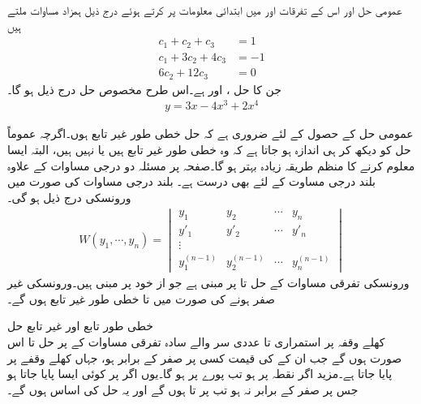 عمومی حل اور اس کے تفرقات  اور  میں ابتدائی معلومات پر کرتے ہوئے درج ذیل ہمزاد مساوات ملتے ہیں
\begin{align*}
c_1+c_2+c_3&=1\\
c_1+3c_2+4c_3&=-1\\
6c_2+12c_3&=0
\end{align*}
جن کا حل ،  اور  ہے۔اس طرح مخصوص حل درج ذیل ہو گا۔
\begin{align*}
y=3x-4x^3+2x^4
\end{align*}

عمومی حل کے حصول کے لئے ضروری ہے کہ حل خطی طور غیر تابع ہوں۔اگرچہ عموماً حل کو دیکھ کر ہی اندازہ ہو جاتا ہے کہ  وہ خطی طور غیر تابع ہیں یا نہیں ہیں، البتہ ایسا معلوم کرنے کا منظم طریقہ زیادہ بہتر ہو گا۔صفحہ  پر مسئلہ  دو درجی   مساوات کے علاوہ بلند درجی مساوت کے لئے بھی درست ہے۔ بلند درجی مساوات کی صورت میں ورونسکی درج ذیل ہو گی۔
\begin{align}\label{مساوات_سادہ_بلند_ورونسکی_الف}
W(y_1,\cdots, y_n)=
\begin{vmatrix}
y_1 & y_2 & \cdots & y_n\\
y'_1 & y'_2 & \cdots & y'_n\\
\vdots & & \\
y_1^{(n-1)} & y_2^{(n-1)} & \cdots & y_n^{(n-1)}
\end{vmatrix}
\end{align}
ورونسکی تفرقی مساوات کے حل  تا  پر مبنی ہے جو از خود  پر مبنی ہیں۔ورونسکی غیر صفر ہونے کی صورت میں   تا  خطی طور غیر تابع ہوں گے۔

\quad خطی طور تابع اور غیر تابع حل\\
کھلے وقفہ  پر استمراری   تا   عددی سر والے سادہ تفرقی  مساوات  کے   پر حل  تا  اس صورت  ہوں گے جب ان کے  کی قیمت  کسی  پر صفر کے برابر  ہو، جہاں  کھلے وقفے  پر پایا جاتا ہے۔مزید اگر  نقطہ  پر  ہو تب پورے  پر   ہو گا۔یوں اگر  پر کوئی ایسا  پایا جاتا ہو جس پر  صفر کے برابر نہ ہو تب  پر   تا   ہوں گے  اور یہ حل کی اساس ہوں گے۔

